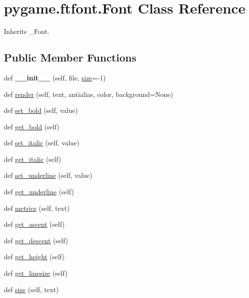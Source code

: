 \hypertarget{classpygame_1_1ftfont_1_1_font}{}\section{pygame.\+ftfont.\+Font Class Reference}
\label{classpygame_1_1ftfont_1_1_font}


Inherits \+\_\+\+Font.

\subsection*{Public Member Functions}
\begin{DoxyCompactItemize}
\item 
\mbox{\label{classpygame_1_1ftfont_1_1_font_a41e778c5d67330f71190750f0acf43d9}} 
def {\bfseries \+\_\+\+\_\+init\+\_\+\+\_\+} (self, file, \hyperlink{classpygame_1_1ftfont_1_1_font_a74f9f8b405c9af43c84703d2552e4cac}{size}=-\/1)
\item 
def \hyperlink{classpygame_1_1ftfont_1_1_font_a49e5ca8d0ca3fbbbc75d46bd6e4351ff}{render} (self, text, antialias, color, background=None)
\item 
def \hyperlink{classpygame_1_1ftfont_1_1_font_aff7afcc8a28bf56f82e0bd7fbe83187f}{set\+\_\+bold} (self, value)
\item 
def \hyperlink{classpygame_1_1ftfont_1_1_font_a5fb693d3ccb1d4622cf045f045077592}{get\+\_\+bold} (self)
\item 
def \hyperlink{classpygame_1_1ftfont_1_1_font_a95da231e409217b7ab1b4944cf769489}{set\+\_\+italic} (self, value)
\item 
def \hyperlink{classpygame_1_1ftfont_1_1_font_a40958a7e8eec2c88bf70951dbab468bb}{get\+\_\+italic} (self)
\item 
def \hyperlink{classpygame_1_1ftfont_1_1_font_af4a7a2d347bde46fa1f9fc73905a7497}{set\+\_\+underline} (self, value)
\item 
def \hyperlink{classpygame_1_1ftfont_1_1_font_a52b45e40fb7e9c11f8ca6b992603d872}{get\+\_\+underline} (self)
\item 
def \hyperlink{classpygame_1_1ftfont_1_1_font_a4d6c9f2508f8e2d124fbbaea401a2817}{metrics} (self, text)
\item 
def \hyperlink{classpygame_1_1ftfont_1_1_font_a0a7db106ed98b2852ee257c33d5b1566}{get\+\_\+ascent} (self)
\item 
def \hyperlink{classpygame_1_1ftfont_1_1_font_a46fe505de2b187b4f4fae8a1d8a08aa9}{get\+\_\+descent} (self)
\item 
def \hyperlink{classpygame_1_1ftfont_1_1_font_aa8d2ad026b6c435faf29f56d03cc9e6b}{get\+\_\+height} (self)
\item 
def \hyperlink{classpygame_1_1ftfont_1_1_font_a1e7c33d760f2ca60fff03d51183d9695}{get\+\_\+linesize} (self)
\item 
def \hyperlink{classpygame_1_1ftfont_1_1_font_a74f9f8b405c9af43c84703d2552e4cac}{size} (self, text)
\end{DoxyCompactItemize}
